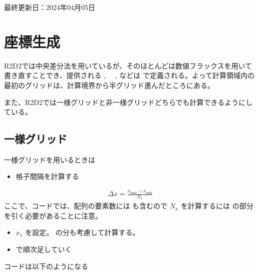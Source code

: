 \documentclass[letterpaper,10pt,dvipdfmx,report]{sphinxmanual}
\begin{document}
\sphinxAtStartPar
最終更新日：2024年04月05日

\sphinxstepscope


\chapter{座標生成}
\label{\detokenize{geometry:id1}}\label{\detokenize{geometry::doc}}
\sphinxAtStartPar
R2D2では中央差分法を用いているが、そのほとんどは数値フラックスを用いて書き直すことでき、提供される  , 　,  などは  で定義される。よって計算領域内の最初のグリッドは、計算境界から半グリッド進んだところにある。

\sphinxAtStartPar
また、R2D2では一様グリッドと非一様グリッドどちらでも計算できるようにしている。


\section{一様グリッド}
\label{\detokenize{geometry:id2}}
\sphinxAtStartPar
一様グリッドを用いるときは
\begin{itemize}
\item {} 
\sphinxAtStartPar
格子間隔を計算する

\end{itemize}
\begin{equation*}
\begin{split}\Delta x = \frac{x_\mathrm{max} - x_\mathrm{min}}{N_x}\end{split}
\end{equation*}
\sphinxAtStartPar
ここで、コードでは、配列の要素数には  も含むので
\(N_x\) を計算するには  の部分を引く必要があることに注意。
\begin{itemize}
\item {} 
\sphinxAtStartPar
\(x_1\) を設定。 の分も考慮して計算する。

\item {} 
\sphinxAtStartPar
{} で順次足していく

\end{itemize}

\sphinxAtStartPar
コードは以下のようになる
\end{document}
